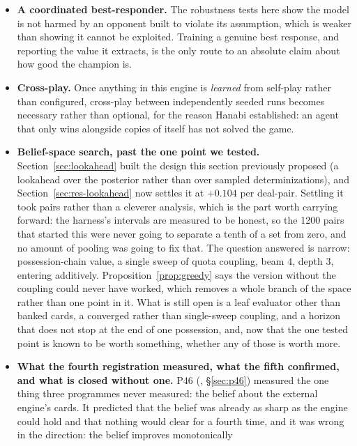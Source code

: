 \documentclass[11pt,letterpaper]{article}
\begin{document}
\begin{itemize}
A fixpoint is still not required, and that is the substantive update: the
opponent being modelled is a policy whose choice rule can be fitted directly
from its own play.
\item \textbf{A coordinated best-responder.} The robustness tests here show the
model is not harmed by an opponent built to violate its assumption, which is
weaker than showing it cannot be exploited. Training a genuine best response,
and reporting the value it extracts, is the only route to an absolute claim
about how good the champion is.
\item \textbf{Cross-play.} Once anything in this engine is \emph{learned} from
self-play rather than configured, cross-play between independently seeded runs
becomes necessary rather than optional, for the reason Hanabi established: an
agent that only wins alongside copies of itself has not solved the game.
\item \textbf{Belief-space search, past the one point we tested.}
Section~\ref{sec:lookahead} built the design this section previously proposed
(a lookahead over the posterior rather than over sampled determinizations),
and Section~\ref{sec:res-lookahead} now settles it at $+0.104$ per deal-pair.
Settling it took pairs rather than a cleverer analysis, which is the part worth
carrying forward: the harness's intervals are measured to be honest, so the
1200 pairs that started this were never going to separate a tenth of a set from
zero, and no amount of pooling was going to fix that. The question answered is
narrow: possession-chain value, a single sweep of quota coupling, beam $4$,
depth $3$, entering additively. Proposition~\ref{prop:greedy} says the version
without the coupling could never have worked, which removes a whole branch of
the space rather than one point in it. What is still open is a leaf evaluator
other than banked cards, a converged rather than single-sweep coupling, and a
horizon that does not stop at the end of one possession, and, now that the
one tested point is known to be worth something, whether any of those is worth
more.
\item \textbf{What the fourth registration measured, what the fifth
confirmed, and what is closed without one.} P46 (,
\S\ref{sec:p46}) measured the one thing three programmes never measured: the
belief about the external engine's cards. It predicted that the belief was already as
sharp as the engine could hold and that nothing would clear for a fourth
time, and it was wrong in the direction: the belief improves monotonically

\end{itemize}
\end{document}
